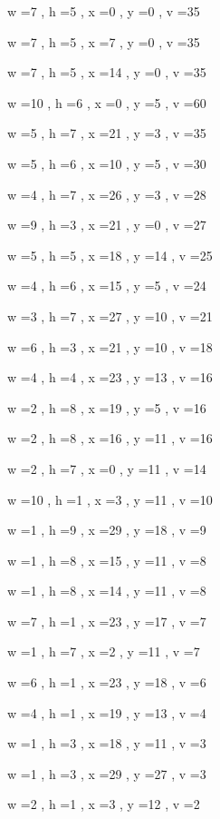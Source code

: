 \documentclass[11pt]{article}
\begin{document}


w =7 , h =5 , x =0 , y =0 , v =35
\par
w =7 , h =5 , x =7 , y =0 , v =35
\par
w =7 , h =5 , x =14 , y =0 , v =35
\par
w =10 , h =6 , x =0 , y =5 , v =60
\par
w =5 , h =7 , x =21 , y =3 , v =35
\par
w =5 , h =6 , x =10 , y =5 , v =30
\par
w =4 , h =7 , x =26 , y =3 , v =28
\par
w =9 , h =3 , x =21 , y =0 , v =27
\par
w =5 , h =5 , x =18 , y =14 , v =25
\par
w =4 , h =6 , x =15 , y =5 , v =24
\par
w =3 , h =7 , x =27 , y =10 , v =21
\par
w =6 , h =3 , x =21 , y =10 , v =18
\par
w =4 , h =4 , x =23 , y =13 , v =16
\par
w =2 , h =8 , x =19 , y =5 , v =16
\par
w =2 , h =8 , x =16 , y =11 , v =16
\par
w =2 , h =7 , x =0 , y =11 , v =14
\par
w =10 , h =1 , x =3 , y =11 , v =10
\par
w =1 , h =9 , x =29 , y =18 , v =9
\par
w =1 , h =8 , x =15 , y =11 , v =8
\par
w =1 , h =8 , x =14 , y =11 , v =8
\par
w =7 , h =1 , x =23 , y =17 , v =7
\par
w =1 , h =7 , x =2 , y =11 , v =7
\par
w =6 , h =1 , x =23 , y =18 , v =6
\par
w =4 , h =1 , x =19 , y =13 , v =4
\par
w =1 , h =3 , x =18 , y =11 , v =3
\par
w =1 , h =3 , x =29 , y =27 , v =3
\par
w =2 , h =1 , x =3 , y =12 , v =2
\par
\newpage
\end{document}
